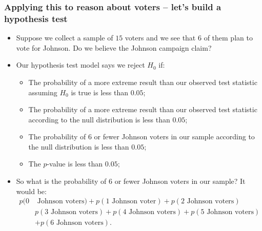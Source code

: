 \documentclass[aspectratio=169]{beamer}
\theoremstyle{principle}
\begin{document}
\begin{frame}
\frametitle{Applying this to reason about voters -- let's build a hypothesis test}

\begin{itemize}

\item Suppose we collect a sample of $15$ voters and we see that $6$ of them plan to vote for Johnson.  Do we believe the Johnson campaign claim?
\bigskip
\bigskip

\item Our hypothesis test model says we reject $H_0$ if:
\begin{itemize}
\item The probability of a more extreme result than our observed test statistic assuming $H_0$ is true is less than $0.05$;
\item The probability of a more extreme result than our observed test statistic according to the null distribution is less than $0.05$;
\item The probability of 6 or fewer Johnson voters in our sample according to the null distribution is less than $0.05$;
\item The $p$-value is less than $0.05$;
\end{itemize}
\bigskip
\bigskip

\item So what is the probability of 6 or fewer Johnson voters in our sample?  It would be:
\begin{align*}
p(0& \mbox{ Johnson voters}) + p(1 \mbox{ Johnson voter}) + p(2 \mbox{ Johnson voters})\\
&p(3 \mbox{ Johnson voters}) + p(4 \mbox{ Johnson voters}) + p(5 \mbox{ Johnson voters})\\
& + p(6 \mbox{ Johnson voters}).
\end{align*}

\end{itemize}

\end{frame}
\end{document}
